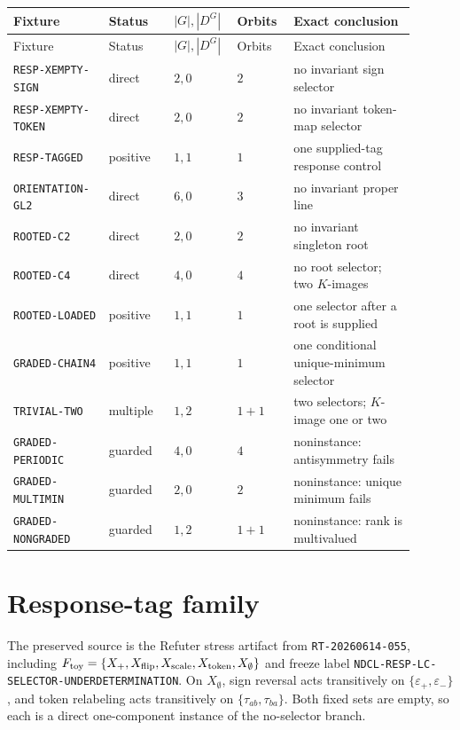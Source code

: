 \documentclass[11pt]{article}
\begin{document}
\small
\begin{longtable}{p{0.21\linewidth}p{0.15\linewidth}p{0.12\linewidth}p{0.13\linewidth}p{0.29\linewidth}}
\toprule
Fixture & Status & \(|G|,|D^G|\) & Orbits & Exact conclusion \\
\midrule
\endfirsthead
\toprule
Fixture & Status & \(|G|,|D^G|\) & Orbits & Exact conclusion \\
\midrule
\endhead
\texttt{RESP-XEMPTY-SIGN} & direct & \(2,0\) & \(2\) & no invariant sign selector \\
\texttt{RESP-XEMPTY-TOKEN} & direct & \(2,0\) & \(2\) & no invariant token-map selector \\
\texttt{RESP-TAGGED} & positive & \(1,1\) & \(1\) & one supplied-tag response control \\
\texttt{ORIENTATION-GL2} & direct & \(6,0\) & \(3\) & no invariant proper line \\
\texttt{ROOTED-C2} & direct & \(2,0\) & \(2\) & no invariant singleton root \\
\texttt{ROOTED-C4} & direct & \(4,0\) & \(4\) & no root selector; two \(K\)-images \\
\texttt{ROOTED-LOADED} & positive & \(1,1\) & \(1\) & one selector after a root is supplied \\
\texttt{GRADED-CHAIN4} & positive & \(1,1\) & \(1\) & one conditional unique-minimum selector \\
\texttt{TRIVIAL-TWO} & multiple & \(1,2\) & \(1+1\) & two selectors; \(K\)-image one or two \\
\texttt{GRADED-PERIODIC} & guarded & \(4,0\) & \(4\) & noninstance: antisymmetry fails \\
\texttt{GRADED-MULTIMIN} & guarded & \(2,0\) & \(2\) & noninstance: unique minimum fails \\
\texttt{GRADED-NONGRADED} & guarded & \(1,2\) & \(1+1\) & noninstance: rank is multivalued \\
\bottomrule
\end{longtable}
\normalsize

\section{Response-tag family}

The preserved source is the Refuter stress artifact from
\texttt{RT-20260614-055}, including
\(F_{\rm toy}=\{X_+,X_{\rm flip},X_{\rm scale},X_{\rm token},X_\emptyset\}\)
and freeze label \texttt{NDCL-RESP-LC-SELECTOR-UNDERDETERMINATION}.
On \(X_\emptyset\), sign reversal acts transitively on
\(\{\varepsilon_+,\varepsilon_-\}\), and token relabeling acts transitively
on \(\{\tau_{ab},\tau_{ba}\}\). Both fixed sets are empty, so each is a
direct one-component instance of the no-selector branch.
\end{document}
